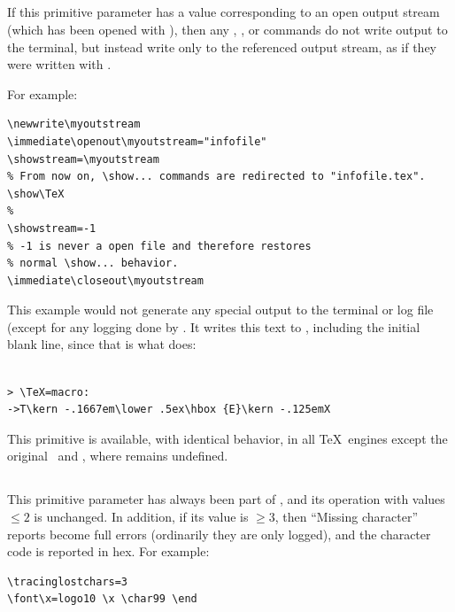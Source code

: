 \documentclass{pdftexmanual}
\begin{document}
\subsection{}

If this primitive parameter has a value corresponding to an open output
stream (which has been opened with ), then any ,
,  or  commands do not write
output to the terminal, but instead write only to the referenced output
stream, as if they were written with .

For example:
\begin{verbatim}
\newwrite\myoutstream
\immediate\openout\myoutstream="infofile"
\showstream=\myoutstream
% From now on, \show... commands are redirected to "infofile.tex".
\show\TeX
%
\showstream=-1
% -1 is never a open file and therefore restores
% normal \show... behavior.
\immediate\closeout\myoutstream
\end{verbatim}

This example would not generate any special output to the terminal or
log file (except for any logging done by . It writes
this text to , including the initial blank line,
since that is what  does:

\begin{verbatim}

> \TeX=macro:
->T\kern -.1667em\lower .5ex\hbox {E}\kern -.125emX
\end{verbatim}

This primitive is available, with identical behavior, in all \TeX\
engines except the original \TEX\ and \eTeX, where 
remains undefined. \introduced{1.40.24}

\subsection{}

This primitive parameter has always been part of \TEX, and its operation
with values $\le2$ is unchanged. In addition, if its value is
$\ge3$, then ``Missing character'' reports become full errors
(ordinarily they are only logged), and the character code is reported in
hex. For example:

\begin{verbatim}
\tracinglostchars=3
\font\x=logo10 \x \char99 \end
\end{verbatim}
\end{document}
